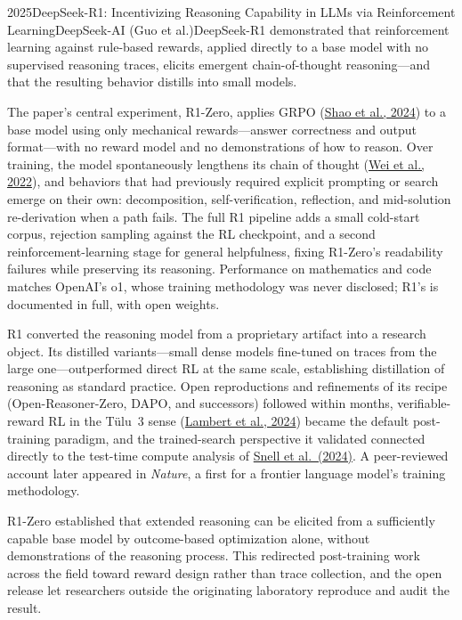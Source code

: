 
\begin{papersummary}{2025}{DeepSeek-R1: Incentivizing Reasoning Capability in LLMs via Reinforcement Learning}{DeepSeek-AI (Guo et al.)}{DeepSeek-R1 demonstrated that reinforcement learning against rule-based rewards, applied directly to a base model with no supervised reasoning traces, elicits emergent chain-of-thought reasoning---and that the resulting behavior distills into small models.}

The paper's central experiment, R1-Zero, applies GRPO (\hyperref[paper:shao-2024-grpo]{Shao et al., 2024}) to a base model using only mechanical rewards---answer correctness and output format---with no reward model and no demonstrations of how to reason. Over training, the model spontaneously lengthens its chain of thought (\hyperref[paper:wei-2022]{Wei et al., 2022}), and behaviors that had previously required explicit prompting or search emerge on their own: decomposition, self-verification, reflection, and mid-solution re-derivation when a path fails. The full R1 pipeline adds a small cold-start corpus, rejection sampling against the RL checkpoint, and a second reinforcement-learning stage for general helpfulness, fixing R1-Zero's readability failures while preserving its reasoning. Performance on mathematics and code matches OpenAI's o1, whose training methodology was never disclosed; R1's is documented in full, with open weights.

R1 converted the reasoning model from a proprietary artifact into a research object. Its distilled variants---small dense models fine-tuned on traces from the large one---outperformed direct RL at the same scale, establishing distillation of reasoning as standard practice. Open reproductions and refinements of its recipe (Open-Reasoner-Zero, DAPO, and successors) followed within months, verifiable-reward RL in the T\"ulu~3 sense (\hyperref[paper:lambert-2024-tulu3]{Lambert et al., 2024}) became the default post-training paradigm, and the trained-search perspective it validated connected directly to the test-time compute analysis of \hyperref[paper:snell-2024-test-time]{Snell et al.\ (2024)}. A peer-reviewed account later appeared in \textit{Nature}, a first for a frontier language model's training methodology.

R1-Zero established that extended reasoning can be elicited from a sufficiently capable base model by outcome-based optimization alone, without demonstrations of the reasoning process. This redirected post-training work across the field toward reward design rather than trace collection, and the open release let researchers outside the originating laboratory reproduce and audit the result.

\end{papersummary}
